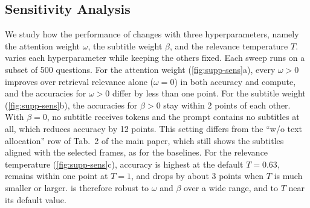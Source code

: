 \subsection{Sensitivity Analysis}
\label{sec:supp-sens}

We study how the performance of \name changes with three hyperparameters, namely the attention weight $\omega$, the subtitle weight $\beta$, and the relevance temperature $T$.  varies each hyperparameter while keeping the others fixed. Each sweep runs on a subset of 500 questions. For the attention weight (\cref{fig:supp-sens}a), every $\omega>0$ improves over retrieval relevance alone ($\omega=0$) in both accuracy and compute, and the accuracies for $\omega>0$ differ by less than one point. For the subtitle weight (\cref{fig:supp-sens}b), the accuracies for $\beta>0$ stay within 2 points of each other. With $\beta=0$, no subtitle receives tokens and the prompt contains no subtitles at all, which reduces accuracy by 12 points. This setting differs from the ``w/o text allocation'' row of Tab.~2 of the main paper, which still shows the subtitles aligned with the selected frames, as for the baselines. For the relevance temperature (\cref{fig:supp-sens}c), accuracy is highest at the default $T=0.63$, remains within one point at $T=1$, and drops by about 3 points when $T$ is much smaller or larger. \name is therefore robust to $\omega$ and $\beta$ over a wide range, and to $T$ near its default value.
